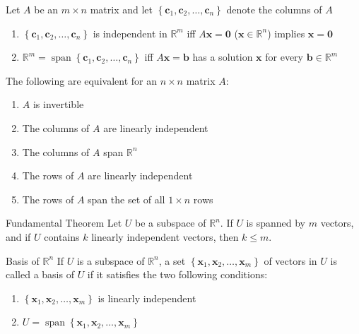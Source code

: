 \documentclass[12pt]{article}
\begin{document}
\begin{theorem}{}{}
    Let $ A $ be an $ m \times n $ matrix and let $ \left\{ \mathbf{c}_1, \mathbf{c}_2, \dots, \mathbf{c}_n \right\} $ denote the columns of $ A $
    \begin{enumerate}
        \item $ \left\{ \mathbf{c}_1, \mathbf{c}_2, \dots, \mathbf{c}_n \right\} $ is independent in $ \mathbb{R}^m $ iff $ A \mathbf{x} = \mathbf{0} $ ($ \mathbf{x} \in \mathbb{R}^n $) implies $ \mathbf{x} = \mathbf{0} $
        \item $ \mathbb{R}^m = \operatorname{span} \left\{ \mathbf{c}_1, \mathbf{c}_2, \dots, \mathbf{c}_n \right\} $ iff $ A \mathbf{x} = \mathbf{b} $ has a solution $ \mathbf{x} $ for every $ \mathbf{b} \in \mathbb{R}^m $
    \end{enumerate}
\end{theorem}

\begin{theorem}{}{}
    The following are equivalent for an $ n \times n $ matrix $ A $:
    \begin{enumerate}
        \item $ A $ is invertible
        \item The columns of $ A $ are linearly independent
        \item The columns of $ A $ span $ \mathbb{R}^n $
        \item The rows of $ A $ are linearly independent
        \item The rows of $ A $ span the set of all $ 1 \times n $ rows
    \end{enumerate}
\end{theorem}

\begin{theorem}{Fundamental Theorem}{}
    Let $ U $ be a subspace of $ \mathbb{R}^n $. If $ U $ is spanned by $ m $ vectors, and if $ U $ contains $ k $ linearly independent vectors, then $ k \leq m $.
\end{theorem}

\begin{definition}{Basis of $ \mathbb{R}^n $}{}
    If $ U $ is a subspace of $ \mathbb{R}^n $, a set $ \left\{ \mathbf{x}_1, \mathbf{x}_2, \dots, \mathbf{x}_m \right\} $ of vectors in $ U $ is called a basis of $ U $ if it satisfies the two following conditions:
    \begin{enumerate}
        \item $ \left\{ \mathbf{x}_1, \mathbf{x}_2, \dots, \mathbf{x}_m \right\} $ is linearly independent
        \item $ U = \operatorname{span} \left\{ \mathbf{x}_1, \mathbf{x}_2, \dots, \mathbf{x}_m \right\} $
    \end{enumerate}
\end{definition}
\end{document}
